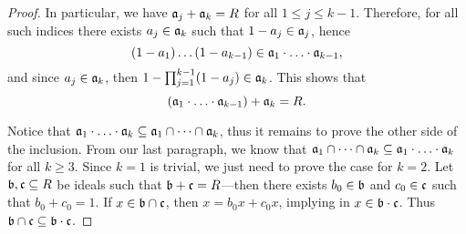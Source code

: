 \begin{proof}
In particular, we have \(\mathfrak{a}_j + \mathfrak{a}_k = R\) for all \(1 \leq j \leq
k - 1\). Therefore, for all such indices there exists \(a_j \in \mathfrak{a}_k\)
such that \(1 - a_j \in \mathfrak{a}_j\), hence
\[
(1 - a_1) \dots (1 - a_{k-1}) \in
\mathfrak{a}_1 \cdot \ldots \cdot \mathfrak{a}_{k-1},
\]
and since \(a_j \in \mathfrak{a}_k\), then
\(1 - \prod_{j=1}^{k-1} (1 - a_j) \in \mathfrak{a}_k\). This shows that
\begin{equation}\label{eq:coprime-ideals-CRT}
(\mathfrak{a}_1 \cdot \ldots \cdot \mathfrak{a}_{k-1}) + \mathfrak{a}_k = R.
\end{equation}

Notice that
\(\mathfrak{a}_1 \cdot \ldots \cdot \mathfrak{a}_k \subseteq \mathfrak{a}_1 \cap \dots \cap
\mathfrak{a}_k\), thus it remains to prove the other side of the inclusion. From our
last paragraph, we know that
\(\mathfrak{a}_1 \cap \dots \cap \mathfrak{a}_k \subseteq \mathfrak{a}_1 \cdot \ldots \cdot
\mathfrak{a}_k \) for all \(k \geq 3\). Since \(k = 1\) is trivial, we just need to
prove the case for \(k = 2\). Let \(\mathfrak{b}, \mathfrak{c} \subseteq R\) be ideals
such that \(\mathfrak{b} + \mathfrak{c} = R\)---then there exists \(b_0 \in \mathfrak{b}\)
and \(c_0 \in \mathfrak{c}\) such that \(b_0 + c_0 = 1\). If \(x \in \mathfrak{b} \cap
\mathfrak{c}\), then \(x = b_0 x + c_0 x\), implying in \(x \in \mathfrak{b} \cdot
\mathfrak{c}\). Thus \(\mathfrak{b} \cap \mathfrak{c} \subseteq \mathfrak{b} \cdot \mathfrak{c}\).


\end{proof}

